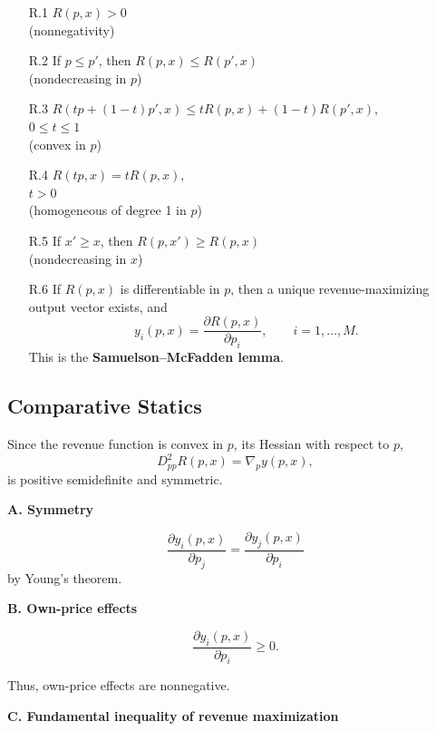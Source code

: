 \begin{itemize}
    \item[R.1] $R(p,x)>0$\\
    (nonnegativity)

    \item[R.2] If $p \le p'$, then $R(p,x) \le R(p',x)$\\
    (nondecreasing in $p$)

    \item[R.3] $R(tp+(1-t)p',x) \le tR(p,x)+(1-t)R(p',x),$\\
    $0\le t\le 1$\\
    (convex in $p$)

    \item[R.4] $R(tp,x)=tR(p,x),$\\
    $t>0$\\
    (homogeneous of degree 1 in $p$)

    \item[R.5] If $x' \ge x$, then $R(p,x') \ge R(p,x)$\\
    (nondecreasing in $x$)

    \item[R.6] If $R(p,x)$ is differentiable in $p$, then a unique
    revenue-maximizing output vector exists, and
    \[
    y_i(p,x)=\frac{\partial R(p,x)}{\partial p_i},
    \qquad i=1,\dots,M.
    \]
    This is the \textbf{Samuelson--McFadden lemma}.
\end{itemize}


\subsection*{Comparative Statics}

Since the revenue function is convex in $p$, its Hessian with respect to $p$,
\[
D^2_{pp}R(p,x)
=
\nabla_p y(p,x),
\]
is positive semidefinite and symmetric.

\medskip

\textbf{A. Symmetry}

\[
\frac{\partial y_i(p,x)}{\partial p_j}
=
\frac{\partial y_j(p,x)}{\partial p_i}
\]
by Young's theorem.

\medskip

\textbf{B. Own-price effects}

\[
\frac{\partial y_i(p,x)}{\partial p_i} \ge 0.
\]

Thus, own-price effects are nonnegative.

\medskip

\textbf{C. Fundamental inequality of revenue maximization}

